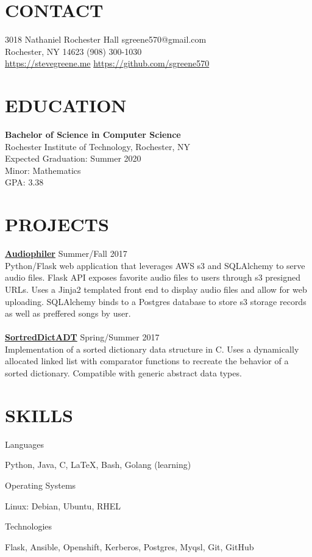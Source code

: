 \documentclass[line, margin, 11pt]{res}
\begin{document}

\begin{resume}

\section {CONTACT}
3018 Nathaniel Rochester Hall \hfill sgreene570@gmail.com \\
Rochester, NY 14623 \hfill (908) 300-1030 \\
\url{https://stevegreene.me} \hfill \url{https://github.com/sgreene570}

\section{EDUCATION}
{\bf Bachelor of Science in Computer Science} \\
Rochester Institute of Technology, Rochester, NY \\
Expected Graduation: Summer 2020 \\
Minor: Mathematics \\
GPA: 3.38

\section{PROJECTS}
{\bf \href{https://github.com/sgreene570/audiophiler}{Audiophiler}} \hfill Summer/Fall 2017 \\
Python/Flask web application that leverages AWS s3 and SQLAlchemy to serve audio
files.  Flask API exposes favorite audio files to users through s3 presigned URLs.
Uses a Jinja2 templated front end to display audio files and allow for web uploading.  SQLAlchemy binds
to a Postgres database to store s3 storage records as well as preffered songs by user.
\\
\\
{\bf \href{https://github.com/sgreene570/SortedDictADT}{SortredDictADT}} \hfill Spring/Summer 2017 \\
Implementation of a sorted dictionary data structure in C.  Uses a dynamically allocated linked list with comparator functions
to recreate the behavior of a sorted dictionary.  Compatible with generic abstract data types.

\section{SKILLS}
\begin{compactdesc}
    \item[Languages] \begin{inparaenum} {Python, Java, C, \LaTeX, Bash, Golang (learning)} \end{inparaenum}
    \item[Operating Systems] \begin{inparaenum} {Linux: Debian, Ubuntu, RHEL} \end{inparaenum}
    \item[Technologies] \begin{inparaenum} {Flask, Ansible, Openshift, Kerberos, Postgres, Myqsl, Git, GitHub} \end{inparaenum}
\end{compactdesc}


\end{resume}
\end{document}
